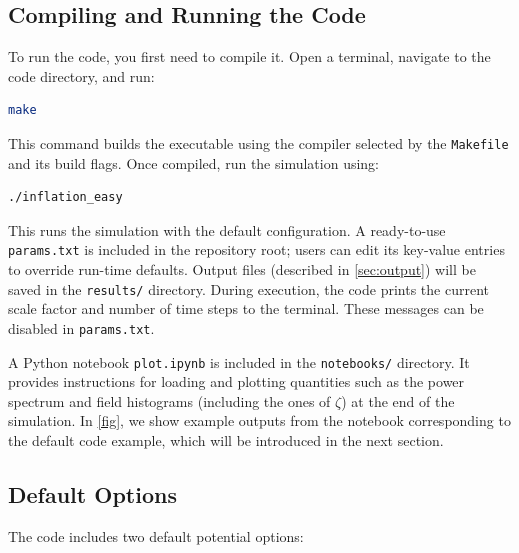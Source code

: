 \documentclass[aps, nofootinbib,superscriptaddress, preprintnumbers, longbibliography]{article}
\begin{document}
\subsection{Compiling and Running the Code}

To run the code, you first need to compile it. Open a terminal, navigate to the code directory, and run:
\begin{lstlisting}[language=bash,numbers=none]
make
\end{lstlisting}
This command builds the executable using the compiler selected by the \texttt{Makefile} and its build flags. Once compiled, run the simulation using:
\begin{lstlisting}[language=bash,numbers=none]
./inflation_easy
\end{lstlisting}
This runs the simulation with the default configuration. A ready-to-use \texttt{params.txt} is included in the repository root; users can edit its key-value entries to override run-time defaults. Output files (described in \cref{sec:output}) will be saved in the \texttt{{results/}} directory. During execution, the code prints the current scale factor and number of time steps to the terminal. These messages can be disabled in \texttt{params.txt}.

A Python notebook \texttt{{plot.ipynb}} is included in the \texttt{notebooks/} directory. It provides instructions for loading and plotting quantities such as the power spectrum and field histograms (including the ones of $\zeta$) at the end of the simulation. In \cref{fig}, we show example outputs from the notebook corresponding to the default code example, which will be introduced in the next section.

\subsection{Default Options}
\label{sec:default}

The code includes two default potential options:
\end{document}

